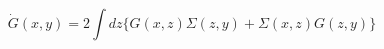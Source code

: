 \begin{equation}
\dot{G}(x,y) =  2 \int dz  \{G(x,z) \Sigma(z,y) + \Sigma (x,z) G(z,y) \}
\label{eq:g}
\end{equation}

